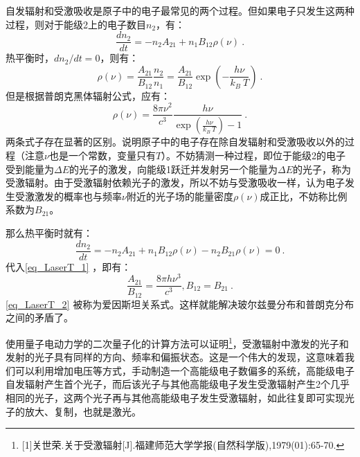自发辐射和受激吸收是原子中的电子最常见的两个过程。但如果电子只发生这两种过程，则对于能级2上的电子数目$n_2$，有：
\begin{equation}
\frac{dn_2}{dt}=-n_2A_{21}+n_1B_{12}\rho(\nu)~.
\end{equation}
热平衡时，$dn_2/dt=0$，则有：
\begin{equation}
\rho(\nu)=\frac{A_{21}}{B_{12}}\frac{n_2}{n_1}=\frac{A_{21}}{B_{12}}\exp(-\frac{h\nu}{k_B \ T})~.
\end{equation}
但是根据普朗克黑体辐射公式，应有：
\begin{equation}\label{eq_LaserT_1}
\rho(\nu)=\frac{8\pi\nu^2}{c^3}\frac{h\nu}{\exp(\frac{h\nu}{k_B\ T})-1}~.
\end{equation}
两条式子存在显著的区别。说明原子中的电子存在除自发辐射和受激吸收以外的过程（注意$\nu$也是一个常数，变量只有$T$）。不妨猜测一种过程，即位于能级2的电子受到能量为$\Delta E$的光子的激发，向能级1跃迁并发射另一个能量为$\Delta E$的光子，称为受激辐射。由于受激辐射依赖光子的激发，所以不妨与受激吸收一样，认为电子发生受激激发的概率也与频率$\nu$附近的光子场的能量密度$\rho(\nu)$成正比，不妨称比例系数为$B_{21}$。

那么热平衡时就有：
\begin{equation}
\frac{dn_2}{dt}=-n_2A_{21}+n_1B_{12}\rho(\nu)-n_2B_{21}\rho(\nu)=0~.
\end{equation}
代入\autoref{eq_LaserT_1} ，即有：
\begin{equation}\label{eq_LaserT_2}
\frac{A_{21}}{B_{12}}=\frac{8\pi h\nu^3}{c^3},B_{12}=B_{21}~.
\end{equation}
\autoref{eq_LaserT_2} 被称为爱因斯坦关系式。这样就能解决玻尔兹曼分布和普朗克分布之间的矛盾了。

使用量子电动力学的二次量子化的计算方法可以证明\footnote{[1]关世荣.关于受激辐射[J].福建师范大学学报(自然科学版),1979(01):65-70.}，受激辐射中激发的光子和发射的光子具有同样的方向、频率和偏振状态。这是一个伟大的发现，这意味着我们可以利用增加电压等方式，手动制造一个高能级电子数偏多的系统，高能级电子自发辐射产生首个光子，而后该光子与其他高能级电子发生受激辐射产生2个几乎相同的光子，这两个光子再与其他高能级电子发生受激辐射，如此往复即可实现光子的放大、复制，也就是激光。
